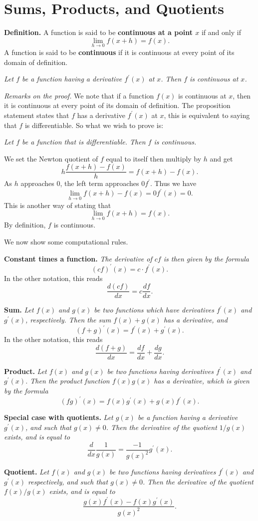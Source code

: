 \section*{Sums, Products, and Quotients}

\textbf{Definition.} A function is said to be \textbf{continuous at a point $x$} if and only if
\[\lim_{h\to0} f(x + h) = f(x).\]
A function is said to be \textbf{continuous} if it is continuous at every point of its domain of definition.

\begin{center}
\textit{Let $f$ be a function having a derivative $f^\prime(x)$ at $x$. Then $f$ is continuous at $x$.}
\end{center}

\textit{Remarks on the proof.}
We note that if a function $f(x)$ is continuous at $x$, then it is continuous at every point of its domain of
definition.
The proposition statement states that $f$ has a derivative $f^\prime(x)$ at $x$, this is equivalent to saying that
$f$ is differentiable. So what we wish to prove is:

\begin{center}
\textit{Let $f$ be a function that is differentiable. Then $f$ is continuous.}
\end{center}

We set the Newton quotient of $f$ equal to itself then multiply by $h$ and get
\[h \frac{f(x + h) - f(x)}{h} = f(x + h) - f(x).\]
As $h$ approaches 0, the left term approaches $0f^\prime$. Thus we have
\[\lim_{h\to0} f(x + h) - f(x) = 0f^\prime(x) = 0.\]
This is another way of stating that
\[\lim_{h\to0} f(x + h) = f(x).\]
By definition, $f$ is continuous.

We now show some computational rules.

\textbf{Constant times a function.} \textit{The derivative of $cf$ is then given by the formula}
\[(cf)^\prime(x) = c \cdot f^\prime(x).\]
In the other notation, this reads
\[\frac{d(cf)}{dx} = c \frac{df}{dx}.\]

\textbf{Sum.} \textit{Let $f(x)$ and $g(x)$ be two functions which have derivatives $f^\prime(x)$ and $g^\prime(x)$,
  respectively. Then the sum $f(x) + g(x)$ has a derivative, and}
\[(f + g)^\prime(x) = f^\prime(x) + g^\prime(x).\]
In the other notation, this reads
\[\frac{d(f + g)}{dx} = \frac{df}{dx} + \frac{dg}{dx}.\]

\textbf{Product.} \textit{Let $f(x)$ and $g(x)$ be two functions having derivatives $f^\prime(x)$ and $g^\prime(x)$.
  Then the product function $f(x)g(x)$ has a derivative, which is given by the formula}
\[(fg)^\prime(x) = f(x)g^\prime(x) + g(x)f^\prime(x).\]

\textbf{Special case with quotients.} \textit{Let $g(x)$ be a function having a derivative $g^\prime(x)$, and such
  that $g(x) \ne 0$. Then the derivative of the quotient $1/g(x)$ exists, and is equal to}
\[\frac{d}{dx} \frac{1}{g(x)} = \frac{-1}{g(x)^2} g^\prime(x).\]

\textbf{Quotient.} \textit{Let $f(x)$ and $g(x)$ be two functions having derivatives $f^\prime(x)$ and $g^\prime(x)$
  respectively, and such that $g(x) \ne 0$. Then the derivative of the quotient $f(x)/g(x)$ exists, and is equal to}
\[\frac{g(x)f^\prime(x) - f(x)g^\prime(x)}{g(x)^2}.\]

